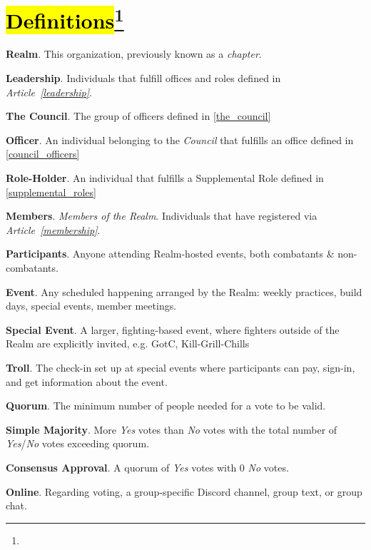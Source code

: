 \documentclass[12pt]{article}
\newcommand{\newpart}[2][]{\hl{#2}\expandafter\ifx\expandafter\relax\detokenize{#1}\relax\else\textnormal{\footnote{#1}}\fi}
\begin{document}
\section{\newpart{Definitions}}
\begin{level}
    \item \textbf{Realm}. This organization, previously known as a \emph{chapter}.
    \item \textbf{Leadership}. Individuals that fulfill offices and roles defined in \emph{Article~\ref{leadership}}.
    \item \textbf{The Council}. The group of officers defined in \ref{the_council}
    \item \textbf{Officer}. An individual belonging to the \emph{Council} that fulfills an office defined in \ref{council_officers}
    \item \textbf{Role-Holder}. An individual that fulfills a Supplemental Role defined in \ref{supplemental_roles}
    \item \textbf{Members}. \emph{Members of the Realm}. Individuals that have registered via \emph{Article~\ref{membership}}.
    \item \textbf{Participants}. Anyone attending Realm-hosted events, both combatants \& non-combatants.
    \item \textbf{Event}. Any scheduled happening arranged by the Realm: weekly practices, build days, special events, member meetings.
    \item \textbf{Special Event}. A larger, fighting-based event, where fighters outside of the Realm are explicitly invited, e.g. GotC, Kill-Grill-Chills
    \item \textbf{Troll}. The check-in set up at special events where participants can pay, sign-in, and get information about the event.
    \item \textbf{Quorum}. The minimum number of people needed for a vote to be valid.
    \item \textbf{Simple Majority}. More \emph{Yes} votes than \emph{No} votes with the total number of \emph{Yes}/\emph{No} votes exceeding quorum.
    \item \textbf{Consensus Approval}. A quorum of \emph{Yes} votes with 0 \emph{No} votes.
    \item \textbf{Online}. Regarding voting, a group-specific Discord channel, group text, or group chat.
\end{level}
\end{document}

